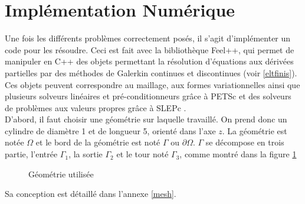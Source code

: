 \part{Implémentation Numérique}
\label{partImp}

Une fois les différents problèmes correctement posés, il s'agit d'implémenter un code pour les résoudre. Ceci est fait avec la bibliothèque Feel++, qui permet de manipuler en C++ des objets permettant la résolution d'équations aux dérivées partielles par des méthodes de Galerkin continues et discontinues (voir \ref{eltfinis}). Ces objets peuvent correspondre au maillage, aux formes variationnelles ainsi que plusieurs solveurs linéaires et pré-conditionneurs grâce à PETSc \cite{petsc-web-page,petsc-user-ref,petsc-efficient} et des solveurs de problèmes aux valeurs propres grâce à SLEPc \cite{Hernandez:2005:SSF}.\\

D'abord, il faut choisir une géométrie sur laquelle travaillé. On prend donc un cylindre de diamètre 1 et de longueur 5, orienté dans l'axe $z$. La géométrie est notée $\Omega$ et le bord de la géométrie est noté $\Gamma$ ou $\partial\Omega$. $\Gamma$ se décompose en trois partie, l'entrée $\Gamma_1$,  la sortie $\Gamma_2$ et le tour noté $\Gamma_3$, comme montré dans la figure \ref{figMesh}\\

\begin{figure}[H]
\centering
{}
\caption{Géométrie utilisée}
\label{figMesh}
\end{figure}

Sa conception est détaillé dans l'annexe \ref{mesh}.

